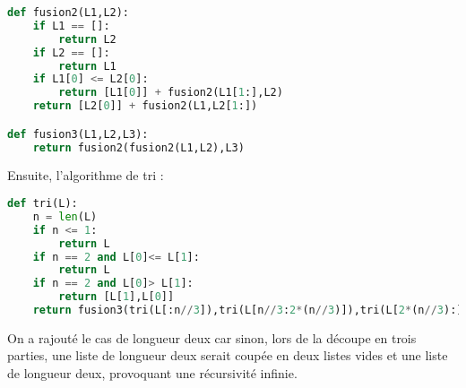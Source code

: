 \documentclass[11pt,a4paper]{article}
\begin{document}
\begin{lstlisting}[language=Python]
def fusion2(L1,L2):
	if L1 == []:
		return L2
	if L2 == []:
		return L1
	if L1[0] <= L2[0]:
		return [L1[0]] + fusion2(L1[1:],L2)
	return [L2[0]] + fusion2(L1,L2[1:])

def fusion3(L1,L2,L3):
	return fusion2(fusion2(L1,L2),L3)
\end{lstlisting}

Ensuite, l'algorithme de tri :
\begin{lstlisting}[language=Python]
def tri(L):
	n = len(L)
	if n <= 1:
		return L
	if n == 2 and L[0]<= L[1]:
		return L
	if n == 2 and L[0]> L[1]:
		return [L[1],L[0]]
	return fusion3(tri(L[:n//3]),tri(L[n//3:2*(n//3)]),tri(L[2*(n//3):]))
\end{lstlisting}
On a rajouté le cas de longueur deux car sinon, lors de la découpe en trois parties, une liste de longueur deux serait coupée en deux listes vides et une liste de longueur deux, provoquant une récursivité infinie.
\end{document}
